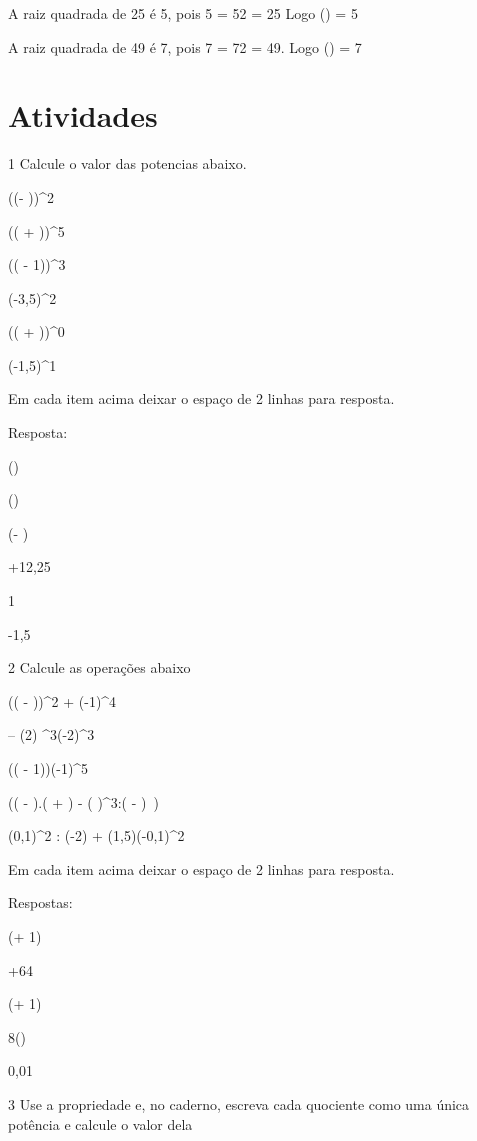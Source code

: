 A raiz quadrada de 25 é 5, pois 5 = 52 = 25 Logo () = 5

A raiz quadrada de 49 é 7, pois 7 = 72 = 49. Logo () = 7

\section{Atividades}


\num{1} Calcule o valor das potencias abaixo.

\item ((- ))^2
\item (( + ))^5
\item (( - 1))^3
\item (-3,5)^2
\item (( + ))^0
\item (-1,5)^1

Em cada item acima deixar o espaço de 2 linhas para resposta.

Resposta:

\item ()
\item ()
\item (- )
\item +12,25
\item 1
\item -1,5

\num{2} Calcule as operações abaixo

\item (( - ))^2 + (-1)^4
\item -- (2) ^3\times (-2)^3
\item (( - 1))\times (-1)^5
\item (\left( -  \right).\left( +  \right) - \left(  \right)^{3}:( - )\ )
\item (0,1)^2 : (-2) + (1,5)\times (-0,1)^2

Em cada item acima deixar o espaço de 2 linhas para resposta.

Respostas:

\item (+ 1)
\item +64
\item (+ 1)
\item 8()
\item 0,01

\num{3} Use a propriedade e, no caderno, escreva cada quociente como uma
única potência e calcule o valor dela

